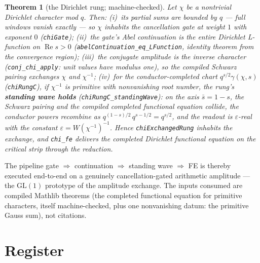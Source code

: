 \documentclass[11pt]{article}
\newtheorem{theorem}{Theorem}
\begin{document}
\begin{theorem}[the Dirichlet rung; machine-checked]
Let $\chi$ be a nontrivial Dirichlet character mod $q$.  Then:
(i)~its partial sums are bounded by $q$ --- full windows vanish exactly --- so $\chi$
inhabits the cancellation gate at weight $1$ with exponent $0$ (\texttt{chiGate});
(ii)~the gate's Abel continuation \emph{is} the entire Dirichlet L-function on
$\operatorname{Re}s>0$ (\texttt{abelContinuation\_eq\_LFunction}, identity theorem
from the convergence region);
(iii)~the conjugate amplitude is the inverse character
(\texttt{conj\_chi\_apply}: unit values have modulus one), so the compiled Schwarz
pairing exchanges $\chi$ and $\chi^{-1}$;
(iv)~for the conductor-completed chart $q^{s/2}\gamma(\chi,s)$
(\texttt{chiRungC}), if $\chi^{-1}$ is primitive with nonvanishing root number, the
rung's \textbf{standing wave holds} (\texttt{chiRungC\_standingWave}): on the axis
$\bar s=1-s$, the Schwarz pairing and the compiled completed functional equation
collide, the conductor powers recombine as
$q^{(1-s)/2}\,q^{s-1/2}=q^{s/2}$, and the readout is $\varepsilon$-real with the
\emph{constant} $\varepsilon=W(\chi^{-1})^{-1}$.
Hence \texttt{chiExchangedRung} inhabits the exchange, and \texttt{chi\_fe} delivers
the completed Dirichlet functional equation on the critical strip through the
reduction.
\end{theorem}

The pipeline gate $\Rightarrow$ continuation $\Rightarrow$ standing wave
$\Rightarrow$ FE is thereby executed end-to-end on a genuinely cancellation-gated
arithmetic amplitude — the $\mathrm{GL}(1)$ prototype of the amplitude exchange.  The
inputs consumed are compiled Mathlib theorems (the completed functional equation for
primitive characters, itself machine-checked, plus one nonvanishing datum: the
primitive Gauss sum), not citations.

\section{Register}
\end{document}
